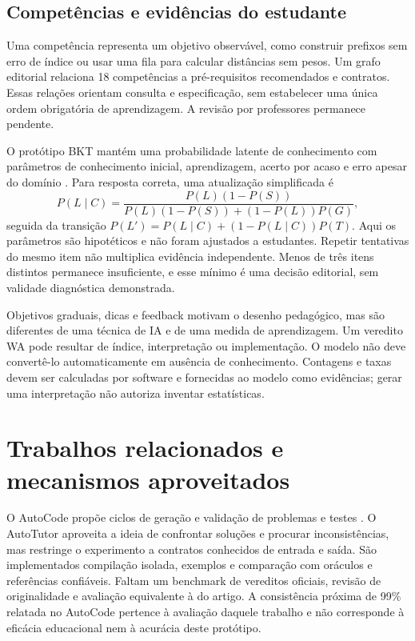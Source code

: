 \documentclass[12pt]{article}
\begin{document}
\subsection{Competências e evidências do estudante}
Uma competência representa um objetivo observável, como construir prefixos sem erro de índice ou usar uma fila para calcular distâncias sem pesos. Um grafo editorial relaciona 18 competências a pré-requisitos recomendados e contratos. Essas relações orientam consulta e especificação, sem estabelecer uma única ordem obrigatória de aprendizagem. A revisão por professores permanece pendente.

O protótipo BKT mantém uma probabilidade latente de conhecimento com parâmetros de conhecimento inicial, aprendizagem, acerto por acaso e erro apesar do domínio \cite{corbett1994}. Para resposta correta, uma atualização simplificada é
\begin{equation}
 P(L\mid C)=\frac{P(L)(1-P(S))}{P(L)(1-P(S))+(1-P(L))P(G)},
\end{equation}
seguida da transição $P(L')=P(L\mid C)+(1-P(L\mid C))P(T)$. Aqui os parâmetros são hipotéticos e não foram ajustados a estudantes. Repetir tentativas do mesmo item não multiplica evidência independente. Menos de três itens distintos permanece insuficiente, e esse mínimo é uma decisão editorial, sem validade diagnóstica demonstrada.

Objetivos graduais, dicas e feedback motivam o desenho pedagógico, mas são diferentes de uma técnica de IA e de uma medida de aprendizagem. Um veredito WA pode resultar de índice, interpretação ou implementação. O modelo não deve convertê-lo automaticamente em ausência de conhecimento. Contagens e taxas devem ser calculadas por software e fornecidas ao modelo como evidências; gerar uma interpretação não autoriza inventar estatísticas.

\section{Trabalhos relacionados e mecanismos aproveitados}
O AutoCode propõe ciclos de geração e validação de problemas e testes \cite{zhou2026}. O AutoTutor aproveita a ideia de confrontar soluções e procurar inconsistências, mas restringe o experimento a contratos conhecidos de entrada e saída. São implementados compilação isolada, exemplos e comparação com oráculos e referências confiáveis. Faltam um benchmark de vereditos oficiais, revisão de originalidade e avaliação equivalente à do artigo. A consistência próxima de 99\% relatada no AutoCode pertence à avaliação daquele trabalho e não corresponde à eficácia educacional nem à acurácia deste protótipo.
\end{document}
